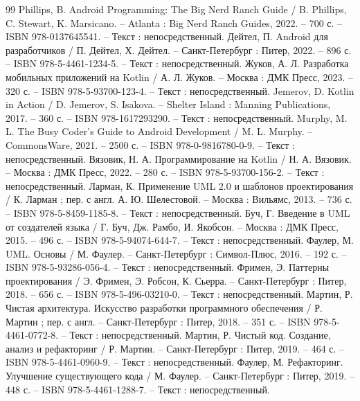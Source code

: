 
\begin{thebibliography}{99}
	 Phillips, B. Android Programming: The Big Nerd Ranch Guide / B. Phillips, C. Stewart, K. Marsicano. – Atlanta : Big Nerd Ranch Guides, 2022. – 700 с. – ISBN 978-0137645541. – Текст : непосредственный.
	 Дейтел, П. Android для разработчиков / П. Дейтел, Х. Дейтел. – Санкт-Петербург : Питер, 2022. – 896 с. – ISBN 978-5-4461-1234-5. – Текст : непосредственный.
	 Жуков, А. Л. Разработка мобильных приложений на Kotlin / А. Л. Жуков. – Москва : ДМК Пресс, 2023. – 320 с. – ISBN 978-5-93700-123-4. – Текст : непосредственный.
	 Jemerov, D. Kotlin in Action / D. Jemerov, S. Isakova. – Shelter Island : Manning Publications, 2017. – 360 с. – ISBN 978-1617293290. – Текст : непосредственный.
	 Murphy, M. L. The Busy Coder's Guide to Android Development / M. L. Murphy. – CommonsWare, 2021. – 2500 с. – ISBN 978-0-9816780-0-9. – Текст : непосредственный.
	 Вязовик, Н. А. Программирование на Kotlin / Н. А. Вязовик. – Москва : ДМК Пресс, 2022. – 280 с. – ISBN 978-5-93700-156-2. – Текст : непосредственный.
	 Ларман, К. Применение UML 2.0 и шаблонов проектирования / К. Ларман ; пер. с англ. А. Ю. Шелестовой. – Москва : Вильямс, 2013. – 736 с. – ISBN 978-5-8459-1185-8. – Текст : непосредственный.
	 Буч, Г. Введение в UML от создателей языка / Г. Буч, Дж. Рамбо, И. Якобсон. – Москва : ДМК Пресс, 2015. – 496 с. – ISBN 978-5-94074-644-7. – Текст : непосредственный.
	 Фаулер, М. UML. Основы / М. Фаулер. – Санкт-Петербург : Символ-Плюс, 2016. – 192 с. – ISBN 978-5-93286-056-4. – Текст : непосредственный.
	 Фримен, Э. Паттерны проектирования / Э. Фримен, Э. Робсон, К. Сьерра. – Санкт-Петербург : Питер, 2018. – 656 с. – ISBN 978-5-496-03210-0. – Текст : непосредственный.
	 Мартин, Р. Чистая архитектура. Искусство разработки программного обеспечения / Р. Мартин ; пер. с англ. – Санкт-Петербург : Питер, 2018. – 351 с. – ISBN 978-5-4461-0772-8. – Текст : непосредственный.
	 Мартин, Р. Чистый код. Создание, анализ и рефакторинг / Р. Мартин. – Санкт-Петербург : Питер, 2019. – 464 с. – ISBN 978-5-4461-0960-9. – Текст : непосредственный.
	 Фаулер, М. Рефакторинг. Улучшение существующего кода / М. Фаулер. – Санкт-Петербург : Питер, 2019. – 448 с. – ISBN 978-5-4461-1288-7. – Текст : непосредственный.

\end{thebibliography}
